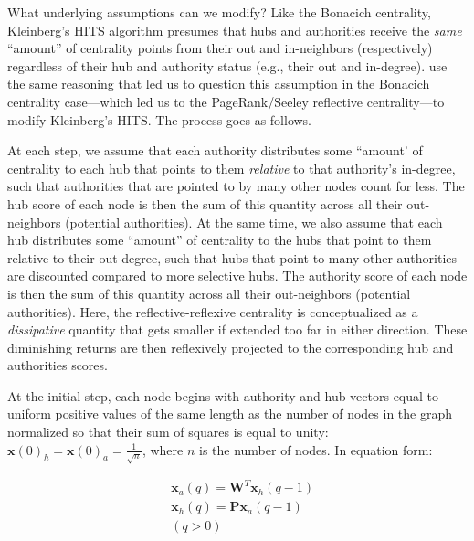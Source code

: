 \documentclass[a4paper,fleqn]{cas-sc}
\begin{document}
What underlying assumptions can we modify? Like the Bonacich centrality, Kleinberg's HITS algorithm presumes that hubs and authorities receive the \textit{same} ``amount'' of centrality points from their out and in-neighbors (respectively) regardless of their hub and authority status (e.g., their out and in-degree). \citet{lempel_moran01} use the same reasoning that led us to question this assumption in the Bonacich centrality case---which led us to the PageRank/Seeley reflective centrality---to modify Kleinberg's HITS. The process goes as follows.

At each step, we assume that each authority distributes some ``amount' of centrality to each hub that points to them \textit{relative} to that authority's in-degree, such that authorities that are pointed to by many other nodes count for less. The hub score of each node is then the sum of this quantity across all their out-neighbors (potential authorities). At the same time, we also assume that each hub distributes some ``amount'' of centrality to the hubs that point to them relative to their out-degree, such that hubs that point to many other authorities are discounted compared to more selective hubs. The authority score of each node is then the sum of this quantity across all their out-neighbors (potential authorities). Here, the reflective-reflexive centrality is conceptualized as a \textit{dissipative} quantity that gets smaller if extended too far in either direction. These diminishing returns are then reflexively projected to the corresponding hub and authorities scores.

At the initial step, each node begins with authority and hub vectors equal to uniform positive values of the same length as the number of nodes in the graph normalized so that their sum of squares is equal to unity: $\mathbf{x}(0)_h = \mathbf{x}(0)_a = \frac{1}{\sqrt{n}}$, where $n$ is the number of nodes. In equation form:

\begin{equation}
    \begin{split}
        &\mathbf{x}_a(q) = \mathbf{W}^T\mathbf{x}_h(q-1) \\
        &\mathbf{x}_h(q) = \mathbf{P}\mathbf{x}_a(q-1) \\
        &(q > 0)
    \end{split}
    \label{eq:salsa}
\end{equation}
\end{document}
